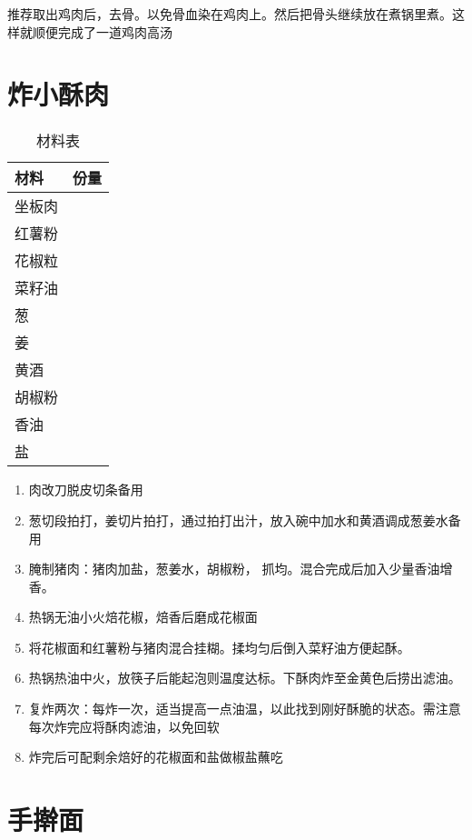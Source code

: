 推荐取出鸡肉后，去骨。以免骨血染在鸡肉上。然后把骨头继续放在煮锅里煮。这样就顺便完成了一道鸡肉高汤


\section{炸小酥肉}

\begin{table}[H]
    \centering
    \begin{tabular}{|l||c|}\hline
     \textbf{材料}    &  \textbf{份量}\\ \hline\hline
    坐板肉   &   \\ \hline
    红薯粉 & \\ \hline
    花椒粒  &   \\ \hline
    菜籽油 & \\ \hline
    葱 & \\ \hline
    姜 & \\ \hline 
    黄酒  & \\ \hline
    胡椒粉 & \\ \hline
    香油 & \\ \hline
    盐 & \\ \hline
    \end{tabular}
    \caption{材料表}
\end{table}

\begin{enumerate}
    \item 肉改刀脱皮切条备用
    \item 葱切段拍打，姜切片拍打，通过拍打出汁，放入碗中加水和黄酒调成葱姜水备用
    \item 腌制猪肉：猪肉加盐，葱姜水，胡椒粉， 抓均。混合完成后加入少量香油增香。
    \item 热锅无油小火焙花椒，焙香后磨成花椒面
    \item 将花椒面和红薯粉与猪肉混合挂糊。揉均匀后倒入菜籽油方便起酥。
    \item 热锅热油中火，放筷子后能起泡则温度达标。下酥肉炸至金黄色后捞出滤油。
    \item 复炸两次：每炸一次，适当提高一点油温，以此找到刚好酥脆的状态。需注意每次炸完应将酥肉滤油，以免回软
    \item 炸完后可配剩余焙好的花椒面和盐做椒盐蘸吃
\end{enumerate}


\section{手擀面}

